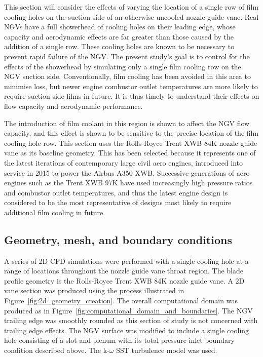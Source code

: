 \documentclass[a4paper, 11pt, oneside]{report}
\begin{document}
This section will consider the effects of varying the location of a single row of film cooling holes on the suction side of an otherwise uncooled nozzle guide vane. Real NGVs have a full showerhead of cooling holes on their leading edge, whose capacity and aerodynamic effects are far greater than those caused by the addition of a single row. These cooling holes are known to be necessary to prevent rapid failure of the NGV. The present study's goal is to control for the effects of the showerhead by simulating only a single film cooling row on the NGV suction side. Conventionally, film cooling has been avoided in this area to minimise loss, but newer engine combustor outlet temperatures are more likely to require suction side films in future. It is thus timely to understand their effects on flow capacity and aerodynamic performance. 

The introduction of film coolant in this region is shown to affect the NGV flow capacity, and this effect is shown to be sensitive to the precise location of the film cooling hole row. This section uses the Rolls-Royce Trent XWB 84K nozzle guide vane as its baseline geometry. This has been selected because it represents one of the latest iterations of contemporary large civil aero engines, introduced into service in 2015 to power the Airbus A350 XWB. Successive generations of aero engines such as the Trent XWB 97K have used increasingly high pressure ratios and combustor outlet temperatures, and thus the latest engine design is considered to be the most representative of designs most likely to require additional film cooling in future.

\subsection{Geometry, mesh, and boundary conditions}

A series of 2D CFD simulations were performed with a single cooling hole at a range of locations throughout the nozzle guide vane throat region. The blade profile geometry is the Rolls-Royce Trent XWB 84K nozzle guide vane. A 2D vane section was produced using the process illustrated in Figure~\ref{fig:2d_geometry_creation}. The overall computational domain was produced as in Figure~\ref{fig:computational_domain_and_boundaries}. The NGV trailing edge was smoothly rounded as this section of study is not concerned with trailing edge effects. The NGV surface was modified to include a single cooling hole consisting of a slot and plenum with its total pressure inlet boundary condition described above. The k-$\omega$ SST turbulence model was used.
\end{document}
